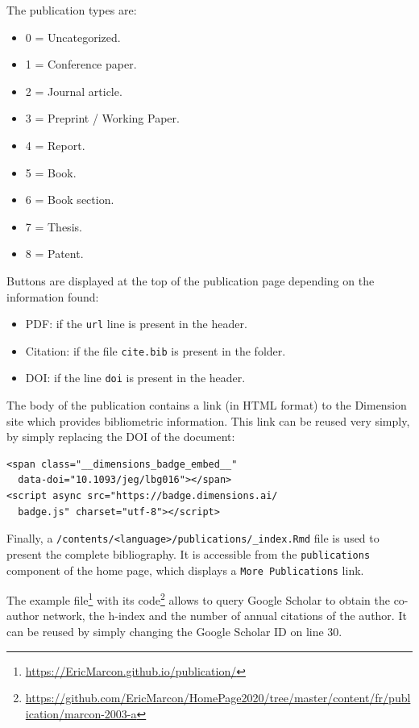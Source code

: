 \documentclass[
  12pt,
  american,
  a4paper,
  extrafontsizes,onecolumn,openright
  ]{memoir}
\providecommand{\tightlist}{%
  \setlength{\itemsep}{0pt}\setlength{\parskip}{0pt}}
\begin{document}
The publication types are:

\begin{itemize}
\tightlist
\item
  0 = Uncategorized.
\item
  1 = Conference paper.
\item
  2 = Journal article.
\item
  3 = Preprint / Working Paper.
\item
  4 = Report.
\item
  5 = Book.
\item
  6 = Book section.
\item
  7 = Thesis.
\item
  8 = Patent.
\end{itemize}

Buttons are displayed at the top of the publication page depending on the information found:

\begin{itemize}
\tightlist
\item
  PDF: if the \texttt{url} line is present in the header.
\item
  Citation: if the file \texttt{cite.bib} is present in the folder.
\item
  DOI: if the line \texttt{doi} is present in the header.
\end{itemize}

The body of the publication contains a link (in HTML format) to the Dimension site which provides bibliometric information.
This link can be reused very simply, by simply replacing the DOI of the document:

\begin{verbatim}
<span class="__dimensions_badge_embed__" 
  data-doi="10.1093/jeg/lbg016"></span>
<script async src="https://badge.dimensions.ai/
  badge.js" charset="utf-8"></script>
\end{verbatim}

Finally, a \texttt{/contents/\textless{}language\textgreater{}/publications/\_index.Rmd} file is used to present the complete bibliography.
It is accessible from the \texttt{publications} component of the home page, which displays a \texttt{More\ Publications} link.

The example file\footnote{\url{https://EricMarcon.github.io/publication/}} with its code\footnote{\url{https://github.com/EricMarcon/HomePage2020/tree/master/content/fr/publication/marcon-2003-a}} allows to query Google Scholar to obtain the co-author network, the h-index and the number of annual citations of the author.
It can be reused by simply changing the Google Scholar ID on line 30.
\end{document}
